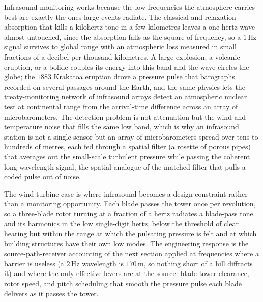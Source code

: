 Infrasound monitoring works because the low frequencies the atmosphere
carries best are exactly the ones large events radiate. The classical and
relaxation absorption that kills a kilohertz tone in a few kilometres leaves
a one-hertz wave almost untouched, since the absorption falls as the square
of frequency, so a $1\,\si{\hertz}$ signal survives to global range with an
atmospheric loss measured in small fractions of a decibel per thousand
kilometres. A large explosion, a volcanic eruption, or a bolide couples its
energy into this band and the wave circles the globe; the $1883$ Krakatoa
eruption drove a pressure pulse that barographs recorded on several
passages around the Earth, and the same physics lets the treaty-monitoring
network of infrasound arrays detect an atmospheric nuclear test at
continental range from the arrival-time difference across an array of
microbarometers. The detection problem is not attenuation but the wind and
temperature noise that fills the same low band, which is why an infrasound
station is not a single sensor but an array of microbarometers spread over
tens to hundreds of metres, each fed through a spatial filter (a rosette of
porous pipes) that averages out the small-scale turbulent pressure while
passing the coherent long-wavelength signal, the spatial analogue of the
matched filter that pulls a coded pulse out of noise.

The wind-turbine case is where infrasound becomes a design constraint rather
than a monitoring opportunity. Each blade passes the tower once per
revolution, so a three-blade rotor turning at a fraction of a hertz radiates
a blade-pass tone and its harmonics in the low single-digit hertz, below the
threshold of clear hearing but within the range at which the pulsating
pressure is felt and at which building structures have their own low modes.
The engineering response is the source-path-receiver accounting of the next
section applied at frequencies where a barrier is useless (a $2\,\si{\hertz}$
wavelength is $170\,\si{\meter}$, so nothing short of a hill diffracts it)
and where the only effective levers are at the source: blade-tower clearance,
rotor speed, and pitch scheduling that smooth the pressure pulse each blade
delivers as it passes the tower.

